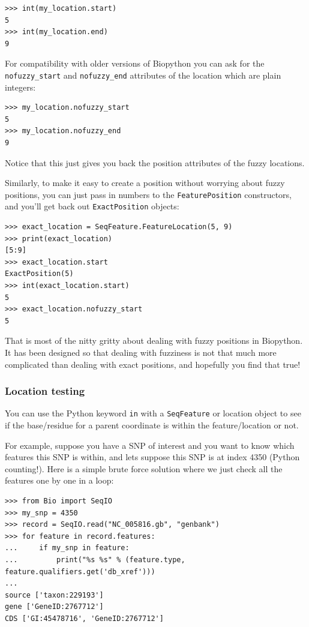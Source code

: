 \documentclass{report}
\begin{document}
\begin{verbatim}
>>> int(my_location.start)
5
>>> int(my_location.end)
9
\end{verbatim}

For compatibility with older versions of Biopython you can ask for the
\verb|nofuzzy_start| and \verb|nofuzzy_end| attributes of the location
which are plain integers:

\begin{verbatim}
>>> my_location.nofuzzy_start
5
>>> my_location.nofuzzy_end
9
\end{verbatim}

Notice that this just gives you back the position attributes of the fuzzy locations.

Similarly, to make it easy to create a position without worrying about fuzzy positions, you can just pass in numbers to the \verb|FeaturePosition| constructors, and you'll get back out \verb|ExactPosition| objects:

\begin{verbatim}
>>> exact_location = SeqFeature.FeatureLocation(5, 9)
>>> print(exact_location)
[5:9]
>>> exact_location.start
ExactPosition(5)
>>> int(exact_location.start)
5
>>> exact_location.nofuzzy_start
5
\end{verbatim}

That is most of the nitty gritty about dealing with fuzzy positions in Biopython.
It has been designed so that dealing with fuzziness is not that much more
complicated than dealing with exact positions, and hopefully you find that true!

\subsubsection{Location testing}

You can use the Python keyword \verb|in| with a \verb|SeqFeature| or location
object to see if the base/residue for a parent coordinate is within the
feature/location or not.

For example, suppose you have a SNP of interest and you want to know which
features this SNP is within, and lets suppose this SNP is at index 4350
(Python counting!). Here is a simple brute force solution where we just
check all the features one by one in a loop:

\begin{verbatim}
>>> from Bio import SeqIO
>>> my_snp = 4350
>>> record = SeqIO.read("NC_005816.gb", "genbank")
>>> for feature in record.features:
...     if my_snp in feature:
...         print("%s %s" % (feature.type, feature.qualifiers.get('db_xref')))
... 
source ['taxon:229193']
gene ['GeneID:2767712']
CDS ['GI:45478716', 'GeneID:2767712']
\end{verbatim}
\end{document}
